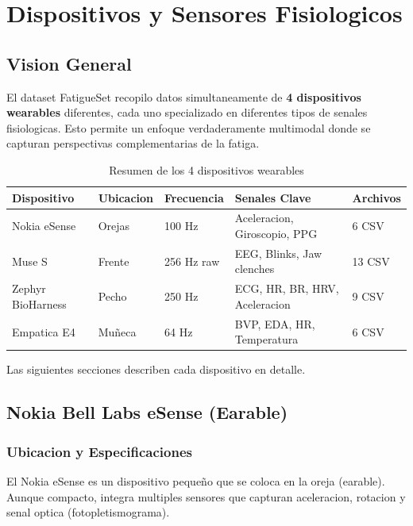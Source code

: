 \chapter{Dispositivos y Sensores Fisiologicos}
\label{cap:sensors}

\section{Vision General}

El dataset FatigueSet recopilo datos simultaneamente de \textbf{4 dispositivos wearables}
diferentes, cada uno specializado en diferentes tipos de senales fisiologicas.
Esto permite un enfoque verdaderamente multimodal donde se capturan perspectivas
complementarias de la fatiga.

\begin{table}[H]
\centering
\caption{Resumen de los 4 dispositivos wearables}
\begin{tabular}{|l|l|l|l|l|}
\hline
\textbf{Dispositivo} & \textbf{Ubicacion} & \textbf{Frecuencia} & \textbf{Senales Clave} & \textbf{Archivos} \\
\hline
Nokia eSense & Orejas & 100 Hz & Aceleracion, Giroscopio, PPG & 6 CSV \\
\hline
Muse S & Frente & 256 Hz raw & EEG, Blinks, Jaw clenches & 13 CSV \\
\hline
Zephyr BioHarness & Pecho & 250 Hz & ECG, HR, BR, HRV, Aceleracion & 9 CSV \\
\hline
Empatica E4 & Muñeca & 64 Hz & BVP, EDA, HR, Temperatura & 6 CSV \\
\hline
\end{tabular}
\end{table}

Las siguientes secciones describen cada dispositivo en detalle.

\section{Nokia Bell Labs eSense (Earable)}

\subsection{Ubicacion y Especificaciones}

El Nokia eSense es un dispositivo pequeño que se coloca en la oreja (earable).
Aunque compacto, integra multiples sensores que capturan aceleracion, rotacion
y senal optica (fotopletismograma).

